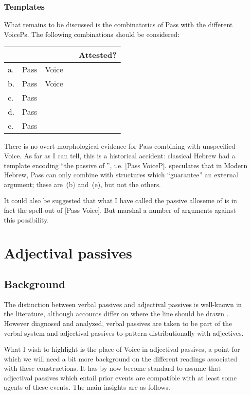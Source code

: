 		\subsubsection{Templates}
What remains to be discussed is the combinatorics of Pass with the different VoicePs. The following combinations should be considered:
\ex \begin{tabular}{llllc}
	& & & & Attested? \\\hline
	a.& Pass	&	Voice	& 		& \xmark \\
	b.& Pass	& Voice		& \va	& {\tpua} \\
	c.& Pass	& {\vz}		& 		& \xmark\\
	d.& Pass	& {\vz}		&	\va	& \xmark\\
	e.& Pass	& {\vd}		&		& {\thuf} \\
	\end{tabular}
\xe

There is no overt morphological evidence for Pass combining with unspecified Voice. As far as I can tell, this is a historical accident: classical Hebrew had a template encoding ``the passive of {\tkal}'', i.e. [Pass VoiceP]. \citet[120]{kastner16phd} speculates that in Modern Hebrew, Pass can only combine with structures which ``guarantee'' an external argument; these are~(\lastx b) and~(\lastx e), but not the others.

It could also be suggested that what I have called the passive alloseme of {\vz} is in fact the spell-out of [Pass Voice]. But \cite{ahdoutkastner19nels} marshal a number of arguments against this possibility.


\section{Adjectival passives} \label{passn:adjpass}

	\subsection{Background}

The distinction between verbal passives and adjectival passives is well-known in the literature, although accounts differ on where the line should be drawn \citep{wasow77,levinrappaport86,borerwexler87,embick04li,alexiadouetal14,layering15,bruening14nllt}. However diagnosed and analyzed, verbal passives are taken to be part of the verbal system and adjectival passives to pattern distributionally with adjectives.

What I wish to highlight is the place of Voice in adjectival passives, a point for which we will need a bit more background on the different readings associated with these constructions. It has by now become standard to assume that adjectival passives which entail prior events are compatible with at least some agents of these events. The main insights are as follows.

